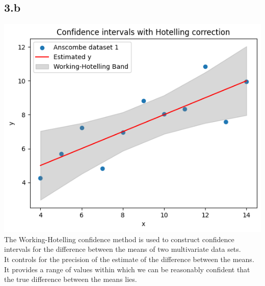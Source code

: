 \documentclass[12pt]{article}
\begin{document}
\newpage
\subsection*{3.b}
\includegraphics*[width=\linewidth]{graph3b}
The Working-Hotelling confidence method is used to construct confidence
intervals for the difference between the means of two multivariate data sets.
\\
It controls for the precision of the estimate of the difference between the means.
It provides a range of values within which we can be reasonably confident that
the true difference between the means lies.

\newpage
\end{document}
